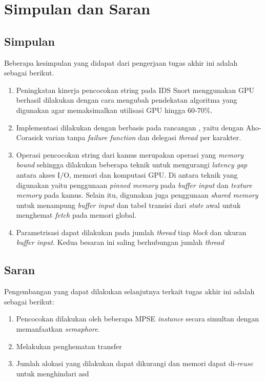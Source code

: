 \chapter{Simpulan dan Saran}

\section{Simpulan}
    Beberapa kesimpulan yang didapat dari pengerjaan tugas akhir ini adalah sebagai berikut.

    \begin{enumerate}

        \item 
        Peningkatan kinerja pencocokan string pada IDS Snort menggunakan GPU berhasil dilakukan dengan cara mengubah pendekatan algoritma yang digunakan agar memaksimalkan utilisasi GPU hingga 60-70\%.

        \item
        Implementasi dilakukan dengan berbasis pada rancangan \cite{lin2013}, yaitu dengan Aho-Corasick varian tanpa \emph{failure function} dan delegasi \emph{thread} per karakter.
        
        \item 
        Operasi pencocokan string dari kamus merupakan operasi yang \emph{memory bound} sehingga dilakukan beberapa teknik untuk mengurangi \emph{latency gap} antara akses I/O, memori dan komputasi GPU. Di antara teknik yang digunakan yaitu penggunaan \emph{pinned memory} pada \emph{buffer input} dan \emph{texture memory} pada kamus. Selain itu, digunakan juga penggunaan \emph{shared memory} untuk menampung \emph{buffer input} dan tabel transisi dari \emph{state} awal untuk menghemat \emph{fetch} pada memori global.

        \item
        Parametrisasi dapat dilakukan pada jumlah \emph{thread} tiap \emph{block} dan ukuran \emph{buffer input}. Kedua besaran ini saling berhubungan jumlah \emph{thread} 
        
    \end{enumerate}

\section{Saran}
    Pengembangan yang dapat dilakukan selanjutnya terkait tugas akhir ini adalah sebagai berikut:

    \begin{enumerate}

        \item
        Pencocokan dilakukan oleh beberapa MPSE \emph{instance} secara simultan dengan memanfaatkan \emph{semaphore}.

        \item
        Melakukan penghematan transfer 

        \item
        Jumlah alokasi yang dilakukan dapat dikurangi dan memori dapat di-\emph{reuse} untuk menghindari asd
        
    \end{enumerate}